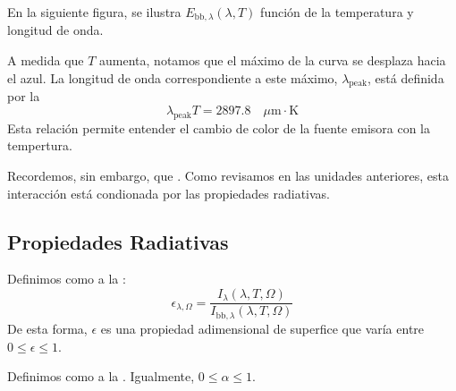 \documentclass[letterpaper,10pt,english]{jupyterBook}
\let\sphinxpxdimen\pdfpxdimen\else\newdimen\sphinxpxdimen
\begin{document}
\sphinxAtStartPar
En la siguiente figura, se ilustra \(E_{\mathrm{bb},\lambda}(\lambda,T)\) función de la temperatura y longitud de onda.

\noindent{\hspace*{\fill}\sphinxincludegraphics[width=700\sphinxpxdimen]{{blackbody_rad}.png}\hspace*{\fill}}

\sphinxAtStartPar
A medida que \(T\) aumenta, notamos que el máximo de la curva se desplaza hacia el azul. La longitud de onda correspondiente a este máximo, \(\lambda_\mathrm{peak}\), está definida por la 
\label{equation:6_RadiacionTermica/6_RadiacionTermica:e3a96c87-4563-43e3-8bba-0f97e12f7615}\begin{equation}
\lambda_\mathrm{peak}T = 2897.8\quad\mu\mathrm{m}\cdot\mathrm{K}
\end{equation}
\sphinxAtStartPar
Esta relación permite entender el cambio de color de la fuente emisora con la tempertura.

\sphinxAtStartPar
Recordemos, sin embargo,  que . Como revisamos en las unidades anteriores, esta interacción está condionada por las propiedades radiativas.


\subsection{Propiedades Radiativas}
\label{\detokenize{6_RadiacionTermica/6_RadiacionTermica:propiedades-radiativas}}
\sphinxAtStartPar
Definimos como  a la :
\label{equation:6_RadiacionTermica/6_RadiacionTermica:4c3b1832-62b1-43b2-a1d6-6967fea6c512}\begin{equation}
\epsilon_{\lambda,\Omega} = \frac{I_\lambda(\lambda,T,\Omega)}{I_{\mathrm{bb},\lambda}(\lambda,T,\Omega)}
\end{equation}
\sphinxAtStartPar
De esta forma, \(\epsilon\) es una propiedad adimensional de superfice que varía entre \(0 \le \epsilon \le 1\).

\sphinxAtStartPar
Definimos como  a la . Igualmente, \(0 \le \alpha \le 1\).
\end{document}
